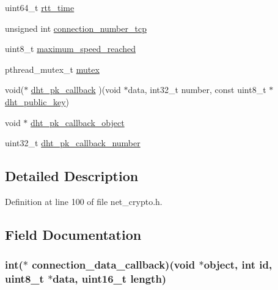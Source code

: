 \begin{DoxyCompactItemize}
\item 
uint64\+\_\+t \hyperlink{struct_crypto___connection_ae88ec876060fbc648a4c75ac596137f9}{rtt\+\_\+time}
\item 
unsigned int \hyperlink{struct_crypto___connection_a51666aaba0fc5680040fe5bd6778bc50}{connection\+\_\+number\+\_\+tcp}
\item 
uint8\+\_\+t \hyperlink{struct_crypto___connection_a8aa9d51e0fa27ad34f8046486d519275}{maximum\+\_\+speed\+\_\+reached}
\item 
pthread\+\_\+mutex\+\_\+t \hyperlink{struct_crypto___connection_a4acff8232e4aec9cd5c6dc200ac55ef3}{mutex}
\item 
void($\ast$ \hyperlink{struct_crypto___connection_ab0f780a41ece58bf84d8460e71cbdbb3}{dht\+\_\+pk\+\_\+callback} )(void $\ast$data, int32\+\_\+t number, const uint8\+\_\+t $\ast$\hyperlink{struct_crypto___connection_ab2ecaa07625ad0ed5e07d3a1f0dcc939}{dht\+\_\+public\+\_\+key})
\item 
void $\ast$ \hyperlink{struct_crypto___connection_ab5d618d73b8d83fb07209433e7b448ee}{dht\+\_\+pk\+\_\+callback\+\_\+object}
\item 
uint32\+\_\+t \hyperlink{struct_crypto___connection_ab0413da421baacf312141b8ae3ec7762}{dht\+\_\+pk\+\_\+callback\+\_\+number}
\end{DoxyCompactItemize}


\subsection{Detailed Description}


Definition at line 100 of file net\+\_\+crypto.\+h.



\subsection{Field Documentation}
\hypertarget{struct_crypto___connection_adc6ee264e4a5758049c6299beb81ce6d}{
\subsubsection[{connection\+\_\+data\+\_\+callback}]{\setlength{\rightskip}{0pt plus 5cm}int($\ast$ connection\+\_\+data\+\_\+callback)(void $\ast$object, int id, uint8\+\_\+t $\ast$data, uint16\+\_\+t length)}}\label{struct_crypto___connection_adc6ee264e4a5758049c6299beb81ce6d}


